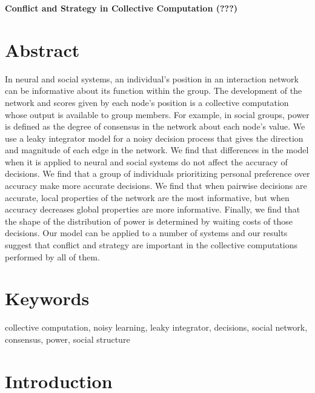 \documentclass{article}
\begin{document}
\begin{center}
\Large

\end{center}


\vspace{0pt}

\begin{center}
{\bf \LARGE{Conflict and Strategy in Collective Computation (???)}}
\end{center}

\section{Abstract}
In neural and social systems, an individual's position in an interaction network can be informative about its function within the group. The development of the network and scores given by each node's position is a collective computation whose output is available to group members.  For example, in social groups, power is defined as the degree of consensus in the network about each node's value. We use a leaky integrator model for a noisy decision process that gives the direction and magnitude of each edge in the network. We find that differences in the model when it is applied to neural and social systems do not affect the accuracy of decisions. We find that a group of individuals prioritizing personal preference over accuracy make more accurate decisions. We find that when pairwise decisions are accurate, local properties of the network are the most informative, but when accuracy decreases global properties are more informative. Finally, we find that the shape of the distribution of power is determined by waiting costs of those decisions. Our model can be applied to a number of systems and our results suggest that conflict and strategy are important in the collective computations performed by all of them.

\section{Keywords }
collective computation, noisy learning, leaky integrator, decisions, social network, consensus, power, social structure

\section{Introduction} 
\end{document}
